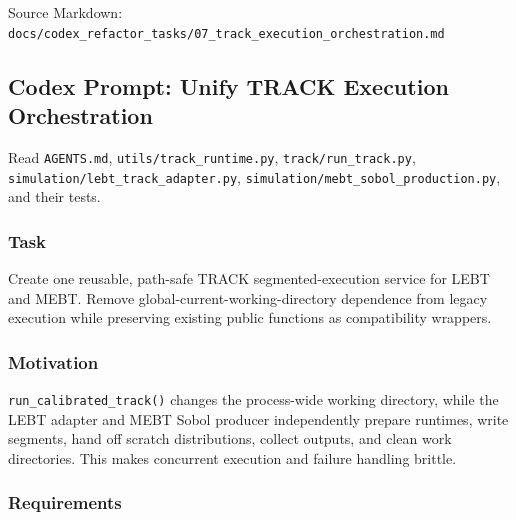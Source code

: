 \documentclass[
]{article}
\begin{document}
Source Markdown:
\texttt{docs/codex\_refactor\_tasks/07\_track\_execution\_orchestration.md}

\hypertarget{codex-prompt-unify-track-execution-orchestration}{%
\subsection{Codex Prompt: Unify TRACK Execution
Orchestration}\label{codex-prompt-unify-track-execution-orchestration}}

Read \texttt{AGENTS.md}, \texttt{utils/track\_runtime.py},
\texttt{track/run\_track.py},
\texttt{simulation/lebt\_track\_adapter.py},
\texttt{simulation/mebt\_sobol\_production.py}, and their tests.

\hypertarget{task-6}{%
\subsubsection{Task}\label{task-6}}

Create one reusable, path-safe TRACK segmented-execution service for
LEBT and MEBT. Remove global-current-working-directory dependence from
legacy execution while preserving existing public functions as
compatibility wrappers.

\hypertarget{motivation}{%
\subsubsection{Motivation}\label{motivation}}

\texttt{run\_calibrated\_track()} changes the process-wide working
directory, while the LEBT adapter and MEBT Sobol producer independently
prepare runtimes, write segments, hand off scratch distributions,
collect outputs, and clean work directories. This makes concurrent
execution and failure handling brittle.

\hypertarget{requirements-6}{%
\subsubsection{Requirements}\label{requirements-6}}
\end{document}
